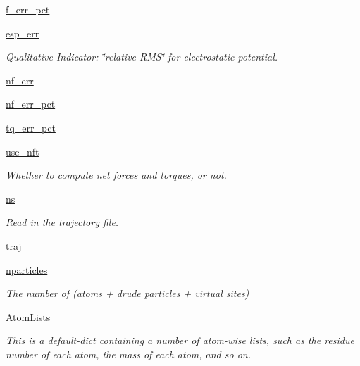 \begin{DoxyCompactItemize}
\hyperlink{classforcebalance_1_1abinitio_1_1AbInitio_a0c48a57c247e6afe97fd178e8b5bce0d}{f\-\_\-err\-\_\-pct}
\item 
\hyperlink{classforcebalance_1_1abinitio_1_1AbInitio_a3a1a04d4af74efa8ff6a1fb8bb6bcc10}{esp\-\_\-err}
\begin{DoxyCompactList}\small\item\em \-Qualitative \-Indicator\-: \char`\"{}relative R\-M\-S\char`\"{} for electrostatic potential. \end{DoxyCompactList}\item 
\hyperlink{classforcebalance_1_1abinitio_1_1AbInitio_a6f22f2576168b879342fb60913ffc134}{nf\-\_\-err}
\item 
\hyperlink{classforcebalance_1_1abinitio_1_1AbInitio_a73def1269c075f82fe20dae6117d75bb}{nf\-\_\-err\-\_\-pct}
\item 
\hyperlink{classforcebalance_1_1abinitio_1_1AbInitio_a9954395e5bb893da066002238d7dbacd}{tq\-\_\-err\-\_\-pct}
\item 
\hyperlink{classforcebalance_1_1abinitio_1_1AbInitio_ad19dc7dc7d2593c143700182dc614435}{use\-\_\-nft}
\begin{DoxyCompactList}\small\item\em \-Whether to compute net forces and torques, or not. \end{DoxyCompactList}\item 
\hyperlink{classforcebalance_1_1abinitio_1_1AbInitio_a86f4e2b085f139886d54855f432a2672}{ns}
\begin{DoxyCompactList}\small\item\em \-Read in the trajectory file. \end{DoxyCompactList}\item 
\hyperlink{classforcebalance_1_1abinitio_1_1AbInitio_a112c4e1af07517633c5c149c07c4aa8c}{traj}
\item 
\hyperlink{classforcebalance_1_1abinitio_1_1AbInitio_ad3dfbd9d397bb7b2bbc3fe0374291e34}{nparticles}
\begin{DoxyCompactList}\small\item\em \-The number of (atoms + drude particles + virtual sites) \end{DoxyCompactList}\item 
\hyperlink{classforcebalance_1_1abinitio_1_1AbInitio_a3eceb701813ccb83d11a0dc71df835b7}{\-Atom\-Lists}
\begin{DoxyCompactList}\small\item\em \-This is a default-\/dict containing a number of atom-\/wise lists, such as the residue number of each atom, the mass of each atom, and so on. \end{DoxyCompactList}\item 

\end{DoxyCompactItemize}
